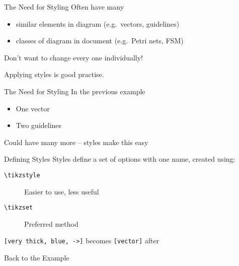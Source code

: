 \begin{frame}{The Need for Styling}
	Often have many
	\begin{itemize}
		\item similar elements in diagram (e.g.\ vectors, guidelines)
		\item classes of diagram in document (e.g.\ Petri nets, FSM)
	\end{itemize}
	Don't want to change every one individually!

	Applying styles is good practise.
\end{frame}

\begin{frame}{The Need for Styling}
	In the previous example
	\begin{itemize}
		\item One vector
		\item Two guidelines
	\end{itemize}
	Could have many more -- styles make this easy
\end{frame}

\begin{frame}{Defining Styles}
	Styles define a set of options with one name, created using:
	\begin{description}
		\item[\texttt{\textbackslash tikzstyle}] Easier to use, less useful
		\item[\texttt{\textbackslash tikzset}] Preferred method
	\end{description}

	\texttt{[very thick, blue, ->]} becomes \texttt{[vector]} after
	

\end{frame}

\begin{frame}[plain]{Back to the Example}

\end{frame}
